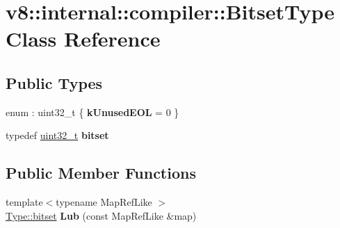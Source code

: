 \hypertarget{classv8_1_1internal_1_1compiler_1_1BitsetType}{}\section{v8\+:\+:internal\+:\+:compiler\+:\+:Bitset\+Type Class Reference}
\label{classv8_1_1internal_1_1compiler_1_1BitsetType}
\subsection*{Public Types}
\begin{DoxyCompactItemize}
\item 
\mbox{\label{classv8_1_1internal_1_1compiler_1_1BitsetType_a90b5441c7e32fb4ae05d50e5d5f329bc}} 
enum \+: uint32\+\_\+t \{ {\bfseries k\+Unused\+E\+OL} = 0
 \}
\item 
\mbox{\label{classv8_1_1internal_1_1compiler_1_1BitsetType_a55ff8e40cc8059060a294f1d32cdd0e9}} 
typedef \mbox{\hyperlink{classuint32__t}{uint32\+\_\+t}} {\bfseries bitset}
\end{DoxyCompactItemize}
\subsection*{Public Member Functions}
\begin{DoxyCompactItemize}
\item 
\mbox{\label{classv8_1_1internal_1_1compiler_1_1BitsetType_acdecadc65b59a7b932c0036deb0fbaa1}} 
{\footnotesize template$<$typename Map\+Ref\+Like $>$ }\\\mbox{\hyperlink{classuint32__t}{Type\+::bitset}} {\bfseries Lub} (const Map\+Ref\+Like \&map)
\end{DoxyCompactItemize}
